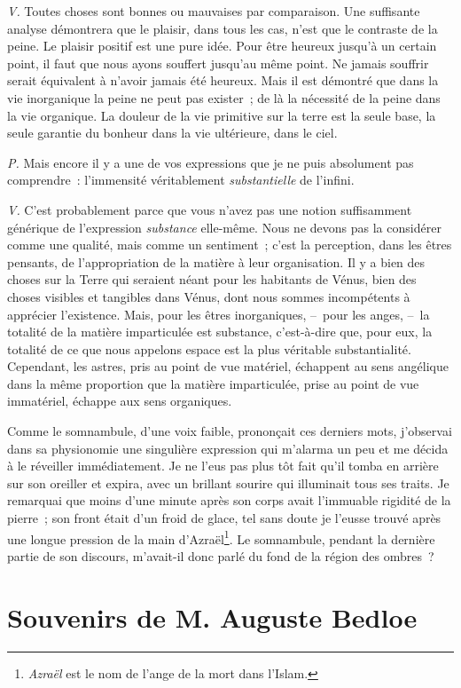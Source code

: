 \documentclass[french,twoside]{book} %
\begin{document}
\emph{V.} Toutes choses sont bonnes ou mauvaises par comparaison. Une suffisante analyse démontrera que le plaisir, dans tous les cas, n’est que le contraste de la peine. Le plaisir positif est une pure idée. Pour être heureux jusqu’à un certain point, il faut que nous ayons souffert jusqu’au même point. Ne jamais souffrir serait équivalent à n’avoir jamais été heureux. Mais il est démontré que dans la vie inorganique la peine ne peut pas exister ; de là la nécessité de la peine dans la vie organique. La douleur de la vie primitive sur la terre est la seule base, la seule garantie du bonheur dans la vie ultérieure, dans le ciel.\par
\emph{P.} Mais encore il y a une de vos expressions que je ne puis absolument pas comprendre : l’immensité véritablement \emph{substantielle} de l’infini.\par
\emph{V.} C’est probablement parce que vous n’avez pas une notion suffisamment générique de l’expression \emph{substance} elle-même. Nous ne devons pas la considérer comme une qualité, mais comme un sentiment ; c’est la perception, dans les êtres pensants, de l’appropriation de la matière à leur organisation. Il y a bien des choses sur la Terre qui seraient néant pour les habitants de Vénus, bien des choses visibles et tangibles dans Vénus, dont nous sommes incompétents à apprécier l’existence. Mais, pour les êtres inorganiques, – pour les anges, – la totalité de la matière imparticulée est substance, c’est-à-dire que, pour eux, la totalité de ce que nous appelons espace est la plus véritable substantialité. Cependant, les astres, pris au point de vue matériel, échappent au sens angélique dans la même proportion que la matière imparticulée, prise au point de vue immatériel, échappe aux sens organiques.\par
\bigbreak
\noindent Comme le somnambule, d’une voix faible, prononçait ces derniers mots, j’observai dans sa physionomie une singulière expression qui m’alarma un peu et me décida à le réveiller immédiatement. Je ne l’eus pas plus tôt fait qu’il tomba en arrière sur son oreiller et expira, avec un brillant sourire qui illuminait tous ses traits. Je remarquai que moins d’une minute après son corps avait l’immuable rigidité de la pierre ; son front était d’un froid de glace, tel sans doute je l’eusse trouvé après une longue pression de la main d’Azraël\footnote{\emph{Azraël} est le nom de l’ange de la mort dans l’Islam.}. Le somnambule, pendant la dernière partie de son discours, m’avait-il donc parlé du fond de la région des ombres ?
\section[{Souvenirs de M. Auguste Bedloe}]{Souvenirs de M. Auguste Bedloe}\renewcommand{\leftmark}{Souvenirs de M. Auguste Bedloe}
\end{document}
